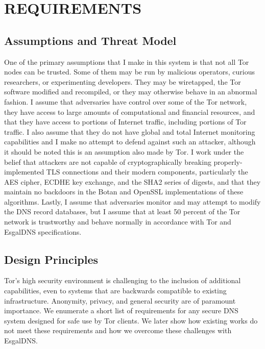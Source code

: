 
\chapter{REQUIREMENTS}

\section{Assumptions and Threat Model}

One of the primary assumptions that I make in this system is that not all Tor nodes can be trusted. Some of them may be run by malicious operators, curious researchers, or experimenting developers. They may be wiretapped, the Tor software modified and recompiled, or they may otherwise behave in an abnormal fashion. I assume that adversaries have control over some of the Tor network, they have access to large amounts of computational and financial resources, and that they have access to portions of Internet traffic, including portions of Tor traffic. I also assume that they do not have global and total Internet monitoring capabilities and I make no attempt to defend against such an attacker, although it should be noted this is an assumption also made by Tor. I work under the belief that attackers are not capable of cryptographically breaking properly-implemented TLS connections and their modern components, particularly the AES cipher, ECDHE key exchange, and the SHA2 series of digests, and that they maintain no backdoors in the Botan and OpenSSL implementations of these algorithms. Lastly, I assume that adversaries monitor and may attempt to modify the DNS record databases, but I assume that at least 50 percent of the Tor network is trustworthy and behave normally in accordance with Tor and EsgalDNS specifications.

\section{Design Principles}

Tor's high security environment is challenging to the inclusion of additional capabilities, even to systems that are backwards compatible to existing infrastructure. Anonymity, privacy, and general security are of paramount importance. We enumerate a short list of requirements for any secure DNS system designed for safe use by Tor clients. We later show how existing works do not meet these requirements and how we overcome these challenges with EsgalDNS.

